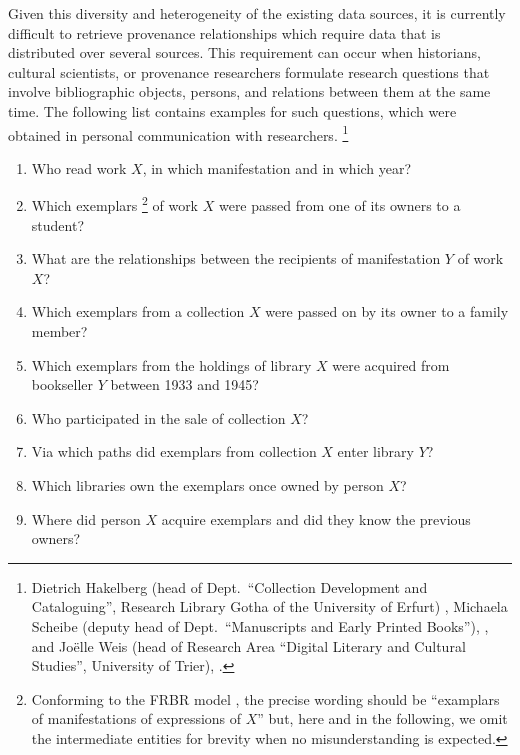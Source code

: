 Given this diversity and heterogeneity of the existing data sources,
it is currently difficult to retrieve provenance relationships
which require data that is distributed over several sources.
This requirement can occur when historians, cultural scientists, or provenance researchers formulate research questions
that involve bibliographic objects, persons, and relations between them at the same time.
The following list contains examples for such questions,
which were obtained in personal communication with researchers.%
\footnote{%
  Dietrich Hakelberg 
  (head of Dept.\ \enquote{Collection Development and Cataloguing}, Research Library Gotha of the University of Erfurt)
  \autocite{HakelbergWeb},
  Michaela Scheibe
  (deputy head of Dept.\ \enquote{Manuscripts and Early Printed Books}),
  \autocite{ScheibeWeb},
  and Jo\"elle Weis 
  (head of Research Area \enquote{Digital Literary and Cultural Studies}, University of Trier), 
  \autocite{WeisWeb}.
}
%
\begin{enumerate}
  \item[\exaquery{1}]
    Who read %
    work $X$, in which manifestation and in which year?
  \item[\exaquery{2}]
    Which exemplars%
    \footnote{%
      Conforming to the FRBR model \autocite{FRBR1998},
      the precise wording should be \enquote{examplars of manifestations of expressions of $X$}
      but, here and in the following,
      we omit the intermediate entities for brevity when no misunderstanding is expected.%
    }
    of work $X$
    were passed from one of its owners to a student?
  \item[\exaquery{3}]
    What are the relationships between the recipients of manifestation $Y$ of work $X$?
  \item[\exaquery{4}]
    Which exemplars from a collection $X$ were passed on by its owner to a family member?
  \item[\exaquery{5}]
    Which exemplars from the holdings of library $X$ were acquired from bookseller $Y$
    between 1933 and 1945?
  \item[\exaquery{6}]
    Who participated in the sale of collection $X$?
  \item[\exaquery{7}]
    Via which paths did exemplars from collection $X$ enter library $Y$?
  \item[\exaquery{8}]
    Which libraries own the exemplars once owned by person $X$?
  \item[\exaquery{9}]
    Where did person $X$ acquire exemplars and did they know the previous owners?
\end{enumerate}
